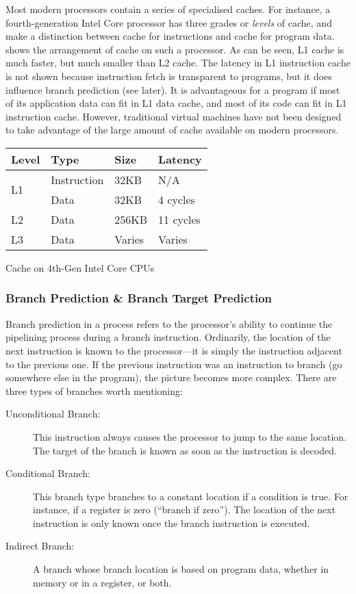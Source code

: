 			Most modern processors contain a series of specialised caches. For instance, a fourth-generation Intel Core processor has three grades or \emph{levels} of cache, and make a distinction between cache for instructions and cache for program data.  shows the arrangement of cache on such a processor. As can be seen, L1 cache is much faster, but much smaller than L2 cache. The latency in L1 instruction cache is not shown because instruction fetch is transparent to programs, but it does influence branch prediction (see later). It is advantageous for a program if most of its application data can fit in L1 data cache, and most of its code can fit in L1 instruction cache. However, traditional virtual machines have not been designed to take advantage of the large amount of cache available on modern processors.
			
			\begin{myfigure}
				\begin{tabular}{ | l | l | l | l | }
					\hline
					Level & Type & Size & Latency \\ 
					\hline
					\multirow{2}{*}{L1} & Instruction & 32KB & N/A \\
					& Data & 32KB & 4 cycles \\
					\hline
					L2 & Data & 256KB & 11 cycles \\
					\hline
					L3 & Data & Varies & Varies \\
					\hline
				\end{tabular}
				\caption{Cache on 4th-Gen Intel Core CPUs \citep{optimisationreference}}
				\label{fig:cachenumbers}
			\end{myfigure}
			
			\subsubsection{Branch Prediction \& Branch Target Prediction}
			Branch prediction in a process refers to the processor's ability to continue the pipelining process during a branch instruction. Ordinarily, the location of the next instruction is known to the processor---it is simply the instruction adjacent to the previous one. If the previous instruction was an instruction to branch (go somewhere else in the program), the picture becomes more complex. There are three types of branches worth mentioning:
			
			\begin{description}
				\item[Unconditional Branch:] This instruction always causes the processor to jump to the same location. The target of the branch is known as soon as the instruction is decoded.
				\item[Conditional Branch:] This branch type branches to a constant location if a condition is true. For instance, if a register is zero (``branch if zero''). The location of the next instruction is only known once the branch instruction is executed.
				\item[Indirect Branch:] A branch whose branch location is based on program data, whether in memory or in a register, or both. 
			\end{description}
			
